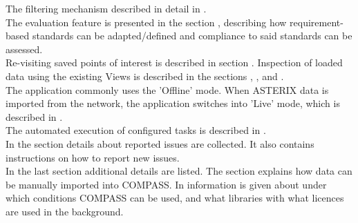 The filtering mechanism described in detail in . \\

The evaluation feature is presented in the section , describing how requirement-based standards can be adapted/defined and compliance to said standards can be assessed. \\

Re-visiting saved points of interest is described in section . Inspection of loaded data using the existing Views is described in the sections , ,  and . \\

The application commonly uses the 'Offline' mode. When ASTERIX data is imported from the network, the application switches into 'Live' mode, which is described in . \\

The automated execution of configured tasks is described in . \\

In the section  details about reported issues are collected. It also contains instructions on how to report new issues. \\

In the last section  additional details are listed. 
The section  explains how data can be manually imported into COMPASS. 
In  information is given about under which conditions COMPASS can be used, and what libraries with what licences are used in the background.

\pagebreak



%








